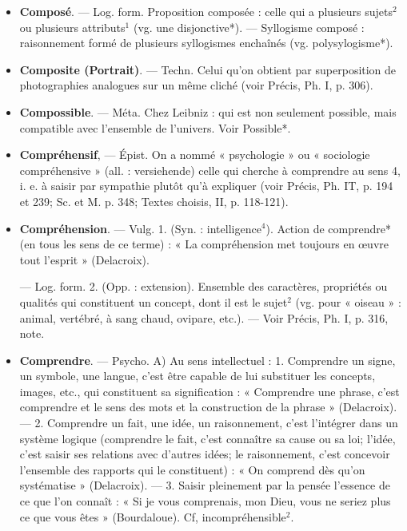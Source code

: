 \begin{itemize}[leftmargin=1cm, label=, itemsep=11pt]
\item {\bf Composé}. — Log. form. Proposition
composée : celle qui a plusieurs
sujets$^2$ ou plusieurs attributs$^1$ (vg.
une disjonctive*). — Syllogisme
composé : raisonnement formé de
plusieurs syllogismes enchaînés (vg.
polysylogisme*).

\item {\bf Composite (Portrait)}. — Techn. Celui
qu’on obtient par superposition
de photographies analogues sur
un même cliché (voir Précis, Ph. I,
p. 306).

\item {\bf Compossible}. — Méta. Chez Leibniz :
qui est non seulement possible,
mais compatible avec l'ensemble de
l'univers. Voir Possible*.

\item {\bf Compréhensif}, — Épist. On a nommé
« psychologie » ou « sociologie compréhensive » (all. : versiehende) celle
qui cherche à comprendre au sens 4,
i. e. à saisir par sympathie plutôt
qu’à expliquer (voir Précis, Ph. IT,
p. 194 et 239; Sc. et M. p. 348;
Textes choisis, II, p. 118-121).

\item {\bf Compréhension}. — Vulg. 1. (Syn. :
intelligence$^4$). Action de comprendre*
(en tous les sens de ce terme) : « La
compréhension met toujours en
œuvre tout l'esprit » (Delacroix).

— Log. form. 2. (Opp. : extension). Ensemble des caractères, propriétés ou qualités qui constituent
un concept, dont il est le sujet$^2$
(vg. pour « oiseau » : animal, vertébré, à sang chaud, ovipare, etc.).
— Voir Précis, Ph. I, p. 316, note.

\item {\bf Comprendre}. — Psycho. A) Au sens
intellectuel : 1. Comprendre un
signe, un symbole, une langue, c'est
être capable de lui substituer les
concepts, images, etc., qui constituent sa signification : « Comprendre
une phrase, c’est comprendre et le
sens des mots et la construction de
la phrase » (Delacroix). — 2. Comprendre
un fait, une idée, un raisonnement, c’est l'intégrer dans un système logique (comprendre le fait,
c'est connaître sa cause ou sa loi;
l’idée, c’est saisir ses relations avec
d’autres idées; le raisonnement,
c'est concevoir l’ensemble des rapports qui le constituent) : « On comprend dès qu’on systématise » (Delacroix). — 3. Saisir pleinement par
la pensée l'essence de ce que l'on
connaît : « Si je vous comprenais,
mon Dieu, vous ne seriez plus ce que
vous êtes » (Bourdaloue). Cf, incompréhensible$^2$.


\end{itemize}
